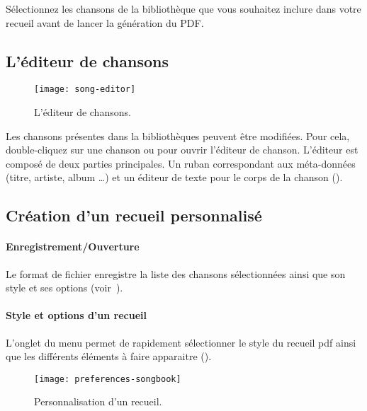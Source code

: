 Sélectionnez les chansons de la bibliothèque que vous souhaitez
inclure dans votre recueil avant de lancer la génération du PDF.

\subsection{L'éditeur de chansons}

\begin{figure}
  \centering
  \texttt{[image: song-editor]}
  \caption{L'éditeur de chansons.}
  \label{fig:song-editor}
\end{figure}

Les chansons présentes dans la bibliothèques peuvent être modifiées.
Pour cela, double-cliquez sur une chanson ou 
pour ouvrir l'éditeur de chanson. L'éditeur est composé de deux
parties principales. Un ruban correspondant aux méta-données (titre,
artiste, album \dots) et un éditeur de texte pour le corps de la
chanson ().

\subsection{Création d'un recueil personnalisé}

\paragraph{Enregistrement/Ouverture}
Le format de fichier  enregistre la liste des chansons
sélectionnées ainsi que son style et ses options
(voir~).

\paragraph{Style et options d'un recueil}
L'onglet  du menu  permet
de rapidement sélectionner le style du recueil pdf ainsi que les
différents éléments à faire apparaitre
().

\begin{figure}
  \centering
  \texttt{[image: preferences-songbook]}
  \caption{Personnalisation d'un recueil.}
  \label{fig:preferences-songbook}
\end{figure}

